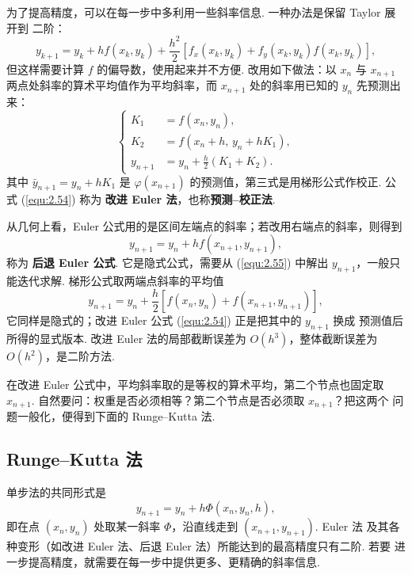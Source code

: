 为了提高精度，可以在每一步中多利用一些斜率信息. 一种办法是保留 Taylor 展开到
二阶：
\begin{equation}\label{equ:2.53}
y_{k+1}=y_k+hf(x_k,y_k)+\frac{h^2}{2}
\left[f_x(x_k,y_k)+f_y(x_k,y_k)f(x_k,y_k)\right],
\end{equation}
但这样需要计算 $f$ 的偏导数，使用起来并不方便. 改用如下做法：以 $x_n$ 与
$x_{n+1}$ 两点处斜率的算术平均值作为平均斜率，而 $x_{n+1}$ 处的斜率用已知的
$y_n$ 先预测出来：
\begin{equation}\label{equ:2.54}
\left\{
\begin{aligned}
K_1&=f(x_n,y_n),\\
K_2&=f(x_n+h,\,y_n+hK_1),\\
y_{n+1}&=y_n+\frac{h}{2}(K_1+K_2).
\end{aligned}
\right.
\end{equation}
其中 $\bar y_{n+1}=y_n+hK_1$ 是 $\varphi(x_{n+1})$ 的预测值，第三式是用梯形公式作校正.
公式 (\ref{equ:2.54}) 称为 \textbf{改进 Euler 法}，也称\textbf{预测--校正法}.

从几何上看，Euler 公式用的是区间左端点的斜率；若改用右端点的斜率，则得到
\begin{equation}\label{equ:2.55}
y_{n+1}=y_n+hf(x_{n+1},y_{n+1}),
\end{equation}
称为 \textbf{后退 Euler 公式}. 它是隐式公式，需要从 (\ref{equ:2.55}) 中解出
$y_{n+1}$，一般只能迭代求解. 梯形公式取两端点斜率的平均值
\[
y_{n+1}=y_n+\frac{h}{2}\left[f(x_n,y_n)+f(x_{n+1},y_{n+1})\right],
\]
它同样是隐式的；改进 Euler 公式 (\ref{equ:2.54}) 正是把其中的 $y_{n+1}$ 换成
预测值后所得的显式版本. 改进 Euler 法的局部截断误差为 $O(h^3)$，整体截断误差为
$O(h^2)$，是二阶方法.

在改进 Euler 公式中，平均斜率取的是等权的算术平均，第二个节点也固定取
$x_{n+1}$. 自然要问：权重是否必须相等？第二个节点是否必须取 $x_{n+1}$？把这两个
问题一般化，便得到下面的 Runge--Kutta 法.

\subsection{Runge--Kutta 法}
单步法的共同形式是
\[
y_{n+1}=y_n+h\Phi(x_n,y_n,h),
\]
即在点 $(x_n,y_n)$ 处取某一斜率 $\Phi$，沿直线走到 $(x_{n+1},y_{n+1})$. Euler 法
及其各种变形（如改进 Euler 法、后退 Euler 法）所能达到的最高精度只有二阶. 若要
进一步提高精度，就需要在每一步中提供更多、更精确的斜率信息.

